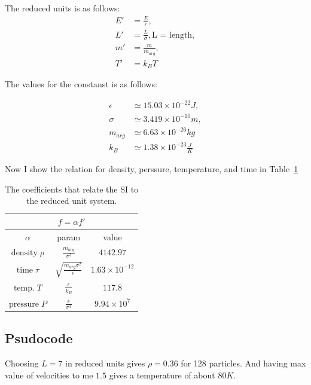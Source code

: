 \documentclass[12pt, a4paper]{article}
\begin{document}
	The reduced units is as follows:
	\begin{equation}
		\begin{aligned}
			E' &= \frac{E}{\epsilon}, \\
			L' &= \frac{L}{\sigma}, \text{L = length},\\
			 m' &= \frac{m}{m_{arg}}, \\
			T' &= k_B T
		\end{aligned}
	\end{equation}

	\newpage
	The values for the constanst is as follows:
	
	\begin{equation}
		\begin{aligned}
			\epsilon &\simeq 15.03 \times 10^{-22} J,\\
			\sigma &\simeq 3.419 \times 10^{-10} m,\\
			m_{arg} &\simeq 6.63 \times 10^{-26} kg\\
			k_B &\simeq 1.38 \times 10^{-23} \frac{J}{K}
		\end{aligned}
	\end{equation}

	Now I show the relation for density, perssure, temperature, and time in Table~\ref{tab:reduced}
	
	\begin{table}[h!]
		\centering
		\begin{tabular}{|c|c|c|}
	\hline
\multicolumn{3}{|c|}{$f = \alpha f'$}\\
\hline
 $\alpha$ & param & value \\
 \hline
$\text{density} \;\rho$ & $\frac{m_{arg}}{\sigma^3}$ & $4142.97$\\
 \hline
 $\text{time}\; \tau$ & $\sqrt{\frac{m_{arg} \sigma^2}{\epsilon}}$ & $1.63 \times 10^{-12}$ \\
 \hline
$\text{temp.} \; T$ & $\frac{\epsilon}{k_B}$ & $117.8$\\
 \hline
 $\text{pressure}\; P$ & $\frac{\epsilon}{\sigma^3}$ & $9.94 \times 10^{7}$ \\	
 \hline
		\end{tabular}
	\caption{The coefficients that relate the SI to the reduced unit system. }
	\label{tab:reduced}
	\end{table}
	
	\newpage
	\subsection{Psudocode}
	Choosing $L = 7$ in reduced units gives $\rho = 0.36$ for 128 particles. And having max value of velocities to me $1.5$ gives a temperature of about $80 K$.\\
	
\end{document}
